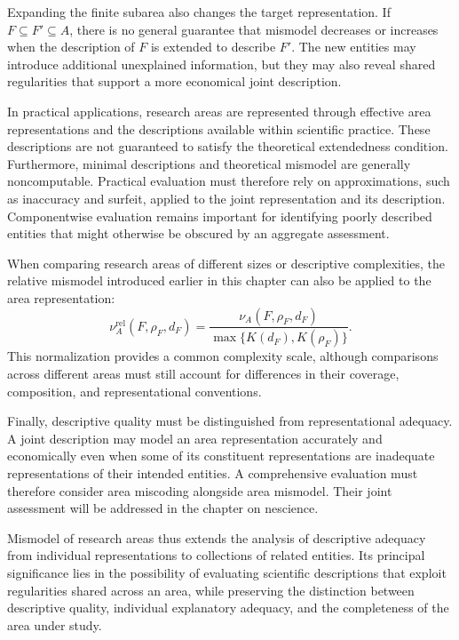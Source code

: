 Expanding the finite subarea also changes the target representation. If $F\subseteq F'\subseteq A$, there is no general guarantee that mismodel decreases or increases when the description of $F$ is extended to describe $F'$. The new entities may introduce additional unexplained information, but they may also reveal shared regularities that support a more economical joint description.

In practical applications, research areas are represented through effective area representations and the descriptions available within scientific practice. These descriptions are not guaranteed to satisfy the theoretical extendedness condition. Furthermore, minimal descriptions and theoretical mismodel are generally noncomputable. Practical evaluation must therefore rely on approximations, such as inaccuracy and surfeit, applied to the joint representation and its description. Componentwise evaluation remains important for identifying poorly described entities that might otherwise be obscured by an aggregate assessment.

When comparing research areas of different sizes or descriptive complexities, the relative mismodel introduced earlier in this chapter can also be applied to the area representation:
\[
\nu_A^{\mathrm{rel}}(F,\rho_F,d_F) = \frac{\nu_A(F,\rho_F,d_F)}{\max\{K(d_F),K(\rho_F)\}}.
\]
This normalization provides a common complexity scale, although comparisons across different areas must still account for differences in their coverage, composition, and representational conventions.

Finally, descriptive quality must be distinguished from representational adequacy. A joint description may model an area representation accurately and economically even when some of its constituent representations are inadequate representations of their intended entities. A comprehensive evaluation must therefore consider area miscoding alongside area mismodel. Their joint assessment will be addressed in the chapter on nescience.

Mismodel of research areas thus extends the analysis of descriptive adequacy from individual representations to collections of related entities. Its principal significance lies in the possibility of evaluating scientific descriptions that exploit regularities shared across an area, while preserving the distinction between descriptive quality, individual explanatory adequacy, and the completeness of the area under study.

%
%


